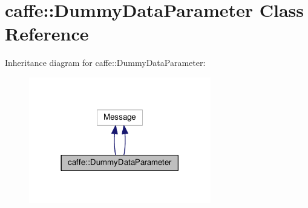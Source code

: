\hypertarget{classcaffe_1_1_dummy_data_parameter}{}\section{caffe\+:\+:Dummy\+Data\+Parameter Class Reference}
\label{classcaffe_1_1_dummy_data_parameter}


Inheritance diagram for caffe\+:\+:Dummy\+Data\+Parameter\+:
\nopagebreak
\begin{figure}[H]
\begin{center}
\leavevmode
\includegraphics[width=225pt]{classcaffe_1_1_dummy_data_parameter__inherit__graph}
\end{center}
\end{figure}
